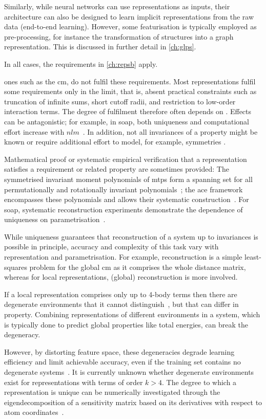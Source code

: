 Similarly, while neural networks can use representations as inputs, their architecture can also be designed to learn implicit representations from the raw data (end-to-end learning). However, some featurisation is typically employed as pre-processing, for instance the transformation of structures into a graph representation. This is discussed in further detail in \cref{ch:glps}.

In all cases, the requirements in \cref{ch:repsb} apply.

 ones such as the \gls{cm}, do not fulfil these requirements.
Most representations fulfil some requirements only in the limit,
that is, absent practical constraints such as truncation of infinite sums, short cutoff radii, and restriction to low-order interaction terms.
%
The degree of fulfilment therefore often depends on \hps.
Effects can be antagonistic;
for example, in \gls{soap}, both uniqueness and computational effort increase with $nlm$~\cite{bkc2013q}.
%
In addition, not all invariances of a property might be known or require additional effort to model, for example, symmetries \cite{gsd2017q}.

Mathematical proof or systematic empirical verification that a representation satisfies a requirement or related property are sometimes provided:
%
The symmetrised invariant moment polynomials of \glspl{mtp} form a spanning set for all permutationally and rotationally invariant polynomials~\cite{s2016q}; the \gls{ace} framework encompasses these polynomials and allows their systematic construction~\cite{dboo2022q}.
For \gls{soap}, systematic reconstruction experiments demonstrate the dependence of uniqueness on parametrisation~\cite{bkc2013q}.

While uniqueness guarantees that reconstruction of a system up to invariances is possible in principle, accuracy and complexity of this task vary with representation and parametrisation.
For example, reconstruction is a simple least-squares problem for the global \gls{cm} as it comprises the whole distance matrix, whereas for local representations, (global) reconstruction is more involved.

If a local representation comprises only up to 4-body terms then there are degenerate environments that it cannot distinguish~\cite{pwcc2020q}, but that can differ in property.
Combining representations of different environments in a system, which is typically done to predict global properties like total energies, can break the degeneracy.

However, by distorting feature space, these degeneracies degrade learning efficiency and limit achievable accuracy, even if the training set contains no degenerate systems~\cite{pwcc2020q}. 
It is currently unknown whether degenerate environments exist for representations with terms of order $k{>}4$.
The degree to which a representation is unique can be numerically investigated through the eigendecomposition of a sensitivity matrix based on its derivatives with respect to atom coordinates~\cite{pdlg2021q}.
